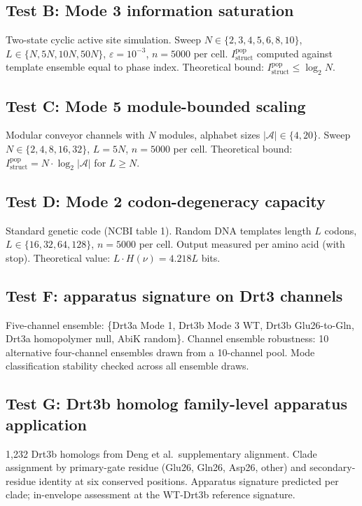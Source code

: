 \documentclass[aps,prx,reprint,amsmath,amssymb,floatfix,superscriptaddress,nofootinbib]{revtex4-2}
\theoremstyle{plain-thm}
\theoremstyle{definition-thm}
\newcommand{\Istructpop}{I_{\mathrm{struct}}^{\mathrm{pop}}}
\begin{document}
\subsection{Test B: Mode 3 information saturation}

Two-state cyclic active site simulation. Sweep $N \in \{2, 3, 4, 5, 6, 8, 10\}$, $L \in \{N, 5N, 10N, 50N\}$, $\varepsilon = 10^{-3}$, $n = 5000$ per cell. $\Istructpop$ computed against template ensemble equal to phase index. Theoretical bound: $\Istructpop \le \log_2 N$.

\subsection{Test C: Mode 5 module-bounded scaling}

Modular conveyor channels with $N$ modules, alphabet sizes $|\mathcal{A}| \in \{4, 20\}$. Sweep $N \in \{2, 4, 8, 16, 32\}$, $L = 5N$, $n = 5000$ per cell. Theoretical bound: $\Istructpop = N \cdot \log_2 |\mathcal{A}|$ for $L \ge N$.

\subsection{Test D: Mode 2 codon-degeneracy capacity}

Standard genetic code (NCBI table 1). Random DNA templates length $L$ codons, $L \in \{16, 32, 64, 128\}$, $n = 5000$ per cell. Output measured per amino acid (with stop). Theoretical value: $L \cdot H(\nu) = 4.218L$ bits.

\subsection{Test F: apparatus signature on Drt3 channels}

Five-channel ensemble: \{Drt3a Mode 1, Drt3b Mode 3 WT, Drt3b Glu26-to-Gln, Drt3a homopolymer null, AbiK random\}. Channel ensemble robustness: 10 alternative four-channel ensembles drawn from a 10-channel pool. Mode classification stability checked across all ensemble draws.

\subsection{Test G: Drt3b homolog family-level apparatus application}

1{,}232 Drt3b homologs from Deng et al.\ supplementary alignment. Clade assignment by primary-gate residue (Glu26, Gln26, Asp26, other) and secondary-residue identity at six conserved positions. Apparatus signature predicted per clade; in-envelope assessment at the WT-Drt3b reference signature.
\end{document}
